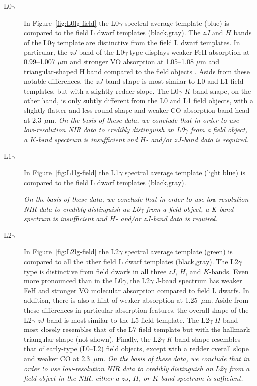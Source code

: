 \documentclass[12pt,preprint]{aastex}
\begin{document}
\begin{description}
\item[L0$\gamma$]{
In Figure~\ref{fig:L0lg-field} the L0$\gamma$ spectral average template (blue) is compared to the field L dwarf templates (black,gray).  
The $zJ$ and $H$ bands of the L0$\gamma$ template are distinctive from the field L dwarf templates. 
In particular, the $zJ$ band of the L0$\gamma$ type displays weaker FeH absorption at 0.99--1.007 $\mu$m and stronger VO absorption at 1.05--1.08 $\mu$m and triangular-shaped H band compared to the field objects \citep{Kirkpatrick06}. 
Aside from these notable differences, the $zJ$-band shape is most similar to L0 and L1 field templates, but with a slightly redder slope. 
The L0$\gamma$ $K$-band shape, on the other hand, is only subtly different from the L0 and L1 field objects, with a slightly flatter and less round shape and weaker CO absorption band head at 2.3~$\mu$m. 
\emph{On the basis of these data, we conclude that in order to use low-resolution NIR data to credibly distinguish an L0$\gamma$ from a field object, a $K$-band spectrum is insufficient and $H$- and/or $zJ$-band data is required.}
}

\item[L1$\gamma$]{
In Figure~\ref{fig:L1lg-field} the L1$\gamma$ spectral average template (light blue) is compared to the field L dwarf templates (black,gray).

\emph{On the basis of these data, we conclude that in order to use low-resolution NIR data to credibly distinguish an L0$\gamma$ from a field object, a $K$-band spectrum is insufficient and $H$- and/or $zJ$-band data is required.}

}

\item[L2$\gamma$]{
In Figure~\ref{fig:L2lg-field} the L2$\gamma$ spectral average template (green) is compared to all the other field L dwarf templates (black,gray). 
The L2$\gamma$ type is distinctive from field dwarfs in all three $zJ$, $H$, and $K$-bands. 
Even more pronounced than in the L0$\gamma$, the L2$\gamma$ J-band spectrum has weaker FeH and stronger VO molecular absorption compared to field L dwarfs. 
In addition, there is also a hint of weaker  absorption at 1.25~$\mu$m. Aside from these differences in particular absorption features, the overall shape of the L2$\gamma$ $zJ$-band is most similar to the L5 field template.
The L2$\gamma$ $H$-band most closely resembles that of the L7 field template but with the hallmark  triangular-shape (not shown). 
Finally, the L2$\gamma$ $K$-band shape resembles that of early-type (L0--L2) field objects, except with a redder overall slope and weaker CO at 2.3~$\mu$m. 
\emph{On the basis of these data, we conclude that in order to use low-resolution NIR data to credibly distinguish an L2$\gamma$ from a field object in the NIR, either a $zJ$, $H$, or $K$-band spectrum is sufficient.}
}


\end{description}
\end{document}
